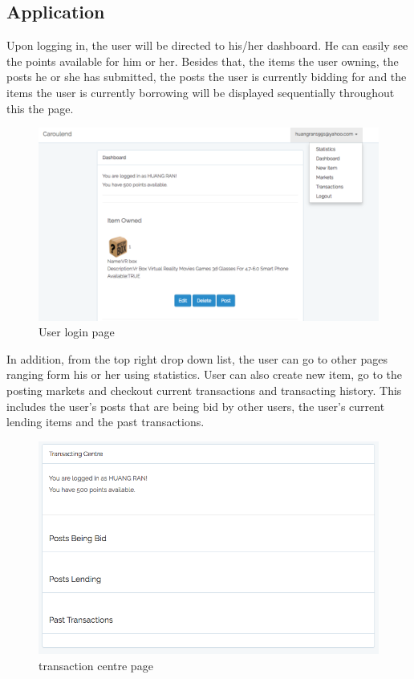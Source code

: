 \subsection{Application}
Upon logging in, the user will be directed to his/her dashboard. He can easily see the points available for him or her. Besides that, the items the user owning, the posts he or she has submitted, the posts the user is currently bidding for and the items the user is currently borrowing will be displayed sequentially throughout this the page.\\
\begin{figure}[h]
      \centering
	\includegraphics[scale=0.3]{dashboard.png}
      \caption{User login page}
\end{figure}
In addition, from the top right drop down list, the user can go to other pages ranging form his or her using statistics. User can also create new item, go to the posting markets and checkout current transactions and transacting history. This includes the user's posts that are being bid by other users, the user's current lending items and the past transactions.

\begin{figure}[h]
      \centering
	\includegraphics[scale=0.3]{transactionCentre.png}
      \caption{transaction centre page}
\end{figure}


